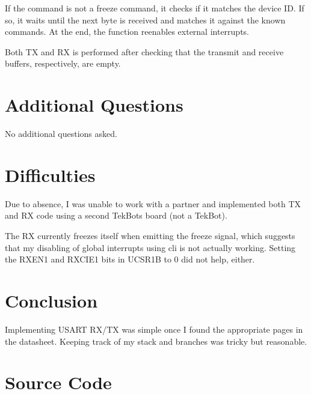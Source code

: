 \documentclass[12pt,letterpaper]{article}
\begin{document}
If the command is not a freeze command, it checks if it matches the device ID.
If so, it waits until the next byte is received and matches it against the
known commands. At the end, the function reenables external interrupts.

Both TX and RX is performed after checking that the transmit and receive
buffers, respectively, are empty.


\section*{Additional Questions}

No additional questions asked.


\section*{Difficulties}

Due to absence, I was unable to work with a partner and implemented both TX and
RX code using a second TekBots board (not a TekBot).

The RX currently freezes itself when emitting the freeze signal, which suggests
that my disabling of global interrupts using cli is not actually working.
Setting the RXEN1 and RXCIE1 bits in UCSR1B to 0 did not help, either.


\section*{Conclusion}

Implementing USART RX/TX was simple once I found the appropriate pages in the
datasheet. Keeping track of my stack and branches was tricky but reasonable.


\newpage
\section*{Source Code}



\end{document}
